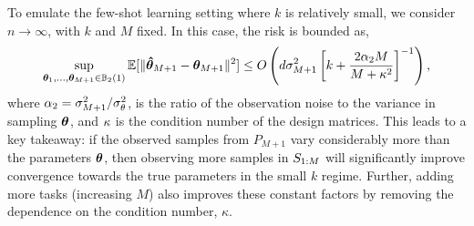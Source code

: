 To emulate the few-shot learning setting where $k$ is relatively small, we consider $n \rightarrow \infty$, with $k$ and $M$ fixed. In this case, the risk is bounded as,
\[\sup_{\bm{\theta}_1,\ldots,\bm{\theta}_{M+1} \in \mathbb{B}_2(1)}\mathbb{E}[\Vert\bm{\hat{\theta}}_{M+1} - \bm{\theta}_{M+1}\Vert^2] \leq O\left(d \sigma^2_{M+1}\left[k + \frac{2\alpha_2 M}{M + \kappa^2} \right]^{-1}\right),\]
where $\alpha_2 = {\sigma_{M+1}^2} / {\sigma_\theta^2}$, is the ratio of the observation noise to the variance in sampling $\bm{\theta}$, and $\kappa$ is the condition number of the design matrices. This leads to a key takeaway: if the observed samples from $P_{M+1}$ vary considerably more than the parameters $\bm{\theta}$, then observing more samples in $S_{1:M}$ will significantly improve convergence towards the true parameters in the small $k$ regime. Further, adding more tasks (increasing $M$) also improves these constant factors by removing the dependence on the condition number, $\kappa$.



